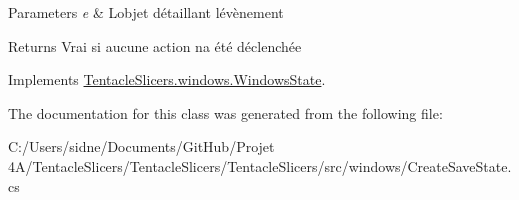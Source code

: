 \begin{DoxyParams}{Parameters}
{\em e} & L\textquotesingle{}objet détaillant l\textquotesingle{}évènement \\
\hline
\end{DoxyParams}
\begin{DoxyReturn}{Returns}
Vrai si aucune action n\textquotesingle{}a été déclenchée 
\end{DoxyReturn}


Implements \hyperlink{class_tentacle_slicers_1_1windows_1_1_windows_state}{Tentacle\+Slicers.\+windows.\+Windows\+State}.



The documentation for this class was generated from the following file\+:\begin{DoxyCompactItemize}
\item 
C\+:/\+Users/sidne/\+Documents/\+Git\+Hub/\+Projet 4\+A/\+Tentacle\+Slicers/\+Tentacle\+Slicers/\+Tentacle\+Slicers/src/windows/Create\+Save\+State.\+cs\end{DoxyCompactItemize}
